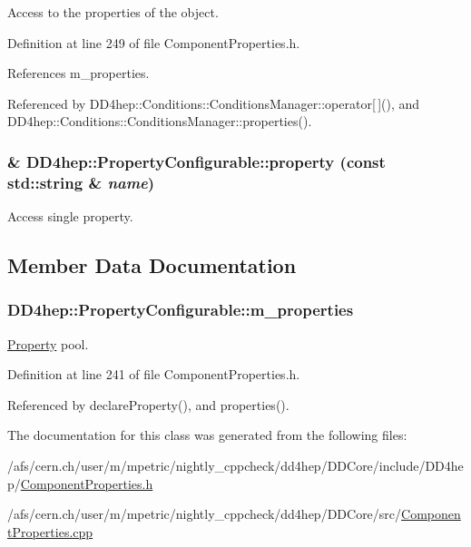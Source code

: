 Access to the properties of the object. 

Definition at line 249 of file ComponentProperties.h.

References m\_\-properties.

Referenced by DD4hep::Conditions::ConditionsManager::operator\mbox{[}$\,$\mbox{]}(), and DD4hep::Conditions::ConditionsManager::properties().\hypertarget{class_d_d4hep_1_1_property_configurable_a810b7f58ab8fd70666d59c42792f508d}{
\subsubsection[{property}]{\& DD4hep::PropertyConfigurable::property (const std::string \& {\em name})}}
\label{class_d_d4hep_1_1_property_configurable_a810b7f58ab8fd70666d59c42792f508d}


Access single property. 

\subsection{Member Data Documentation}
\hypertarget{class_d_d4hep_1_1_property_configurable_a5c68f50853fc154e348be09d10d3f0cf}{
\subsubsection[{m\_\-properties}]{ {\bf DD4hep::PropertyConfigurable::m\_\-properties}}}
\label{class_d_d4hep_1_1_property_configurable_a5c68f50853fc154e348be09d10d3f0cf}


\hyperlink{class_d_d4hep_1_1_property}{Property} pool. 

Definition at line 241 of file ComponentProperties.h.

Referenced by declareProperty(), and properties().

The documentation for this class was generated from the following files:\begin{DoxyCompactItemize}
\item 
/afs/cern.ch/user/m/mpetric/nightly\_\-cppcheck/dd4hep/DDCore/include/DD4hep/\hyperlink{_component_properties_8h}{ComponentProperties.h}\item 
/afs/cern.ch/user/m/mpetric/nightly\_\-cppcheck/dd4hep/DDCore/src/\hyperlink{_component_properties_8cpp}{ComponentProperties.cpp}\end{DoxyCompactItemize}
